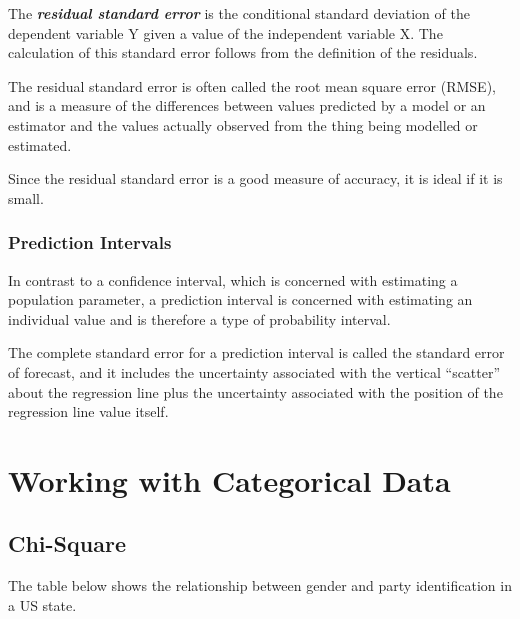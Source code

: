 \documentclass[a4paper,12pt]{article}
\begin{document}
\begin{itemize}
\begin{itemize}
The \textbf{\emph{residual standard error}} is the conditional standard deviation of the dependent variable Y given a value of the independent variable X. The calculation of this standard error follows from the definition of the residuals.

The residual standard error is often called the root mean square error (RMSE), and is a measure of the differences between values predicted by a model or an estimator and the values actually observed from the thing being modelled or estimated.

Since the residual standard error is a good measure of accuracy, it is ideal if it is small.

\subsubsection{Prediction Intervals}
In contrast to a confidence interval, which is concerned with estimating a population parameter, a prediction interval is concerned with estimating an individual value and is therefore a type of probability interval. 

The complete standard error for a prediction interval is called the standard error of forecast, and it includes the uncertainty associated with the vertical “scatter” about the regression line plus the uncertainty associated with the position of the regression line value itself.









\newpage
\section{Working with Categorical Data}
\subsection{Chi-Square}

The table below shows the relationship between gender and party identification in a US state.




\end{itemize}
\end{itemize}
\end{document}
